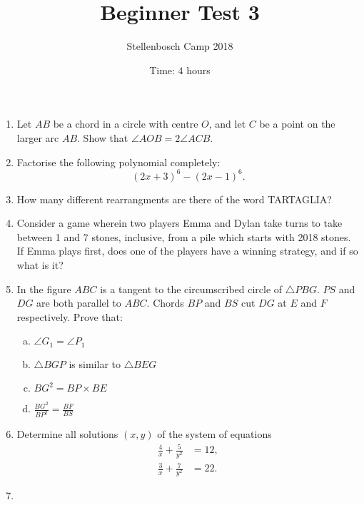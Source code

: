 \documentclass{article}
\title{Beginner Test 3}
\author{Stellenbosch Camp 2018}
\date{Time: $4$ hours}
\begin{document}
\maketitle

\begin{enumerate}[1.]

\vspace{6pt}
\item 
Let $AB$ be a chord in a circle with centre $O$, and let $C$ be a point on the larger arc $AB$. Show that $\angle AOB = 2\angle ACB$.


\vspace{6pt}
\item 
Factorise the following polynomial completely: \[ (2x+3)^6 -(2x-1)^6. \]


\item 
How many different rearrangments are there of the word TARTAGLIA?


\vspace{6pt}
\item 
Consider a game wherein two players Emma and Dylan take turns to take between 1 and 7 stones, inclusive, from a pile which starts with 2018 stones. If Emma plays first, does one of the players have a winning strategy, and if so what is it?


\vspace{6pt}
\item 
In the figure $ABC$ is a tangent to the circumscribed circle of $\triangle PBG$. $PS$ and $DG$ are both parallel to $ABC$. Chords $BP$ and $BS$ cut $DG$ at $E$ and $F$ respectively. Prove that:
\begin{enumerate}[a.]
  \item $\angle G_1 = \angle P_1$
  \item $\triangle BGP$ is similar to $\triangle BEG$
  \item $BG^2 = BP \times BE$
  \item $\frac{BG^2}{BP^2} = \frac{BF}{BS}$
\end{enumerate}


\vspace{6pt}
\item Determine all solutions $(x,y)$ of the system of equations
\begin{align*}
  \frac{4}{x} +\frac{5}{y^2} &= 12, \\
  \frac{3}{x} +\frac{7}{y^2} &= 22.
\end{align*}


\vspace{6pt}
\item 



\end{enumerate}
\end{document}
